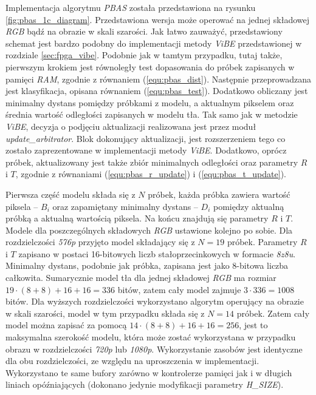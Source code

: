 Implementacja algorytmu \textit{PBAS} została przedstawiona na rysunku \ref{fig:pbas_1c_diagram}. Przedstawiona wersja może operować na jednej składowej \textit{RGB} bądź na obrazie w skali szarości. Jak łatwo zauważyć, przedstawiony schemat jest bardzo podobny do implementacji metody \textit{ViBE} przedstawionej w rozdziale \ref{sec:fpga_vibe}. 
Podobnie jak w tamtym przypadku, tutaj także, pierwszym krokiem jest równoległy test dopasowania do próbek zapisanych w pamięci \textit{RAM}, zgodnie z równaniem (\ref{equ:pbas_dist}). 
Następnie przeprowadzana jest klasyfikacja, opisana równaniem (\ref{equ:pbas_test}). 
Dodatkowo obliczany jest minimalny dystans pomiędzy próbkami z modelu, a aktualnym pikselem oraz średnia wartość odległości zapisanych w modelu tła.
Tak samo jak w metodzie \textit{ViBE}, decyzja o podjęciu aktualizacji realizowana jest przez moduł \textit{update\_arbitrator}. 
Blok dokonujący aktualizacji, jest rozszerzeniem tego co zostało zaprezentowane w implementacji metody \textit{ViBE}. 
Dodatkowo, oprócz próbek, aktualizowany jest także zbiór minimalnych odległości oraz parametry $R$ i $T$, zgodnie z równaniami (\ref{equ:pbas_r_update}) i (\ref{equ:pbas_t_update}).

Pierwsza część modelu składa się z $N$ próbek, każda próbka zawiera wartość piksela -- $B_i$ oraz zapamiętany minimalny dystans -- $D_i$ pomiędzy aktualną próbką a aktualną wartością piksela. 
Na końcu znajdują się parametry $R$ i $T$. 
Modele dla poszczególnych składowych \textit{RGB} ustawione kolejno po sobie. 
Dla rozdzielczości \textit{576p} przyjęto model składający się z $N=19$ próbek. 
Parametry $R$ i $T$ zapisano w postaci 16-bitowych liczb stałoprzecinkowych w formacie \textit{8z8u}. 
Minimalny dystans, podobnie jak próbka, zapisana jest jako 8-bitowa liczba całkowita. 
Sumarycznie model tła dla jednej składowej \textit{RGB} ma rozmiar $19 \cdot (8+8) + 16 + 16 = 336$ bitów, zatem cały model zajmuje $3 \cdot 336 = 1008$ bitów. 
Dla wyższych rozdzielczości wykorzystano algorytm operujący na obrazie w skali szarości, model w tym przypadku składa się z $N=14$ próbek. 
Zatem cały model można zapisać za pomocą $14 \cdot (8+8) + 16 + 16 = 256$, jest to maksymalna szerokość modelu, która może zostać wykorzystana w przypadku obrazu w rozdzielczości \textit{720p} lub \textit{1080p}. Wykorzystanie zasobów jest identyczne dla obu rozdzielczości, ze względu na uproszczenia w implementacji. Wykorzystano te same bufory zarówno w kontrolerze pamięci jak i w długich liniach opóźniających (dokonano jedynie modyfikacji parametry \textit{H\_SIZE}).

